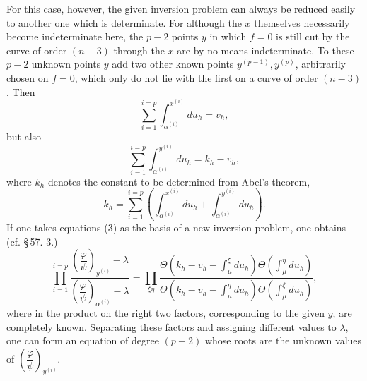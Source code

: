 \documentclass[10pt]{article}
\begin{document}
For this case, however, the given inversion problem can always be reduced easily to another one which is determinate. For although the \(x\) themselves necessarily become indeterminate here, the \(p-2\) points \(y\) in which \(f=0\) is still cut by the curve of order \((n-3)\) through the \(x\) are by no means indeterminate. To these \(p-2\) unknown points \(y\) add two other known points \(y^{(p-1)},y^{(p)}\), arbitrarily chosen on \(f=0\), which only do not lie with the first on a curve of order \((n-3)\). Then
\[
\sum_{i=1}^{i=p}\int_{\alpha^{(i)}}^{x^{(i)}}du_h=v_h,
\]
but also
\[
\tag{3}
\sum_{i=1}^{i=p}\int_{\alpha^{(i)}}^{y^{(i)}}du_h=k_h-v_h,
\]
where \(k_h\) denotes the constant to be determined from Abel's theorem,
\[
k_h=\sum_{i=1}^{i=p}\left(\int_{\alpha^{(i)}}^{x^{(i)}}du_h+
\int_{\alpha^{(i)}}^{y^{(i)}}du_h\right).
\]
If one takes equations (3) as the basis of a new inversion problem, one obtains (cf. \S\,57. 3.)
\[
\prod_{i=1}^{i=p}
\frac{\left(\dfrac{\varphi}{\psi}\right)_{y^{(i)}}-\lambda}
     {\left(\dfrac{\varphi}{\psi}\right)_{\alpha^{(i)}}-\lambda}
=
\prod_{\xi\eta}
\frac{\Theta\left(k_h-v_h-\int_{\mu}^{\xi}du_h\right)\Theta\left(\int_{\mu}^{\eta}du_h\right)}
     {\Theta\left(k_h-v_h-\int_{\mu}^{\eta}du_h\right)\Theta\left(\int_{\mu}^{\xi}du_h\right)},
\]
where in the product on the right two factors, corresponding to the given \(y\), are completely known. Separating these factors and assigning different values to \(\lambda\), one can form an equation of degree \((p-2)\) whose roots are the unknown values of \(\left(\dfrac{\varphi}{\psi}\right)_{y^{(i)}}\).
\end{document}

